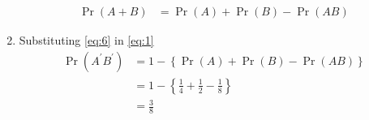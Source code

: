 \documentclass{article}
\providecommand{\brak}[1]{\ensuremath{\left\{#1\right\}}}
\providecommand{\cbrak}[1]{\ensuremath{\left\{#1\right\}}}
\providecommand{\pr}[1]{\ensuremath{\Pr\left(#1\right)}}
\begin{document}
\begin{enumerate}[label=13.\arabic{enumi}.\arabic{enumii}]
\begin{align}
\pr{A+B} &= \pr{A} + \pr{B} - \pr{AB} 
\label{eq:6}
\end{align}
\item Substituting \eqref{eq:6} in \eqref{eq:1}
\begin{align}
\pr{A^{\prime}B^{\prime}} &=  1 - \cbrak{\pr{A} + \pr{B} - \pr{AB} }
\\
&= 1 - \brak{\frac{1}{4} + \frac{1}{2} - \frac{1}{8}}
\\
&= \frac{3}{8}
\label{eq:7}
\end{align}

































\end{enumerate}
\end{document}
